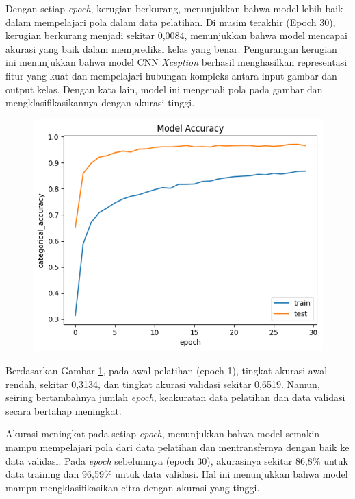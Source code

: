 Dengan setiap\textit{ epoch}, kerugian berkurang, menunjukkan bahwa model lebih baik dalam mempelajari pola dalam data pelatihan. Di musim terakhir (Epoch 30), kerugian berkurang menjadi sekitar 0,0084, menunjukkan bahwa model mencapai akurasi yang baik dalam memprediksi kelas yang benar. Pengurangan kerugian ini menunjukkan bahwa model CNN \textit{Xception} berhasil menghasilkan representasi fitur yang kuat dan mempelajari hubungan kompleks antara input gambar dan output kelas. Dengan kata lain, model ini mengenali pola pada gambar dan mengklasifikasikannya dengan akurasi tinggi.  
\begin{figure}[!hbt]
	\centering
	\includegraphics[width=0.7\linewidth]{gambar/bener/Accuracy_ModelResNet50V2.png}
	\label{fig:AkurasiCNNResNet50V2}
\end{figure}
Berdasarkan Gambar \ref{fig:AkurasiCNNResNet50V2}, pada awal pelatihan (epoch 1), tingkat akurasi awal rendah, sekitar 0,3134, dan tingkat akurasi validasi sekitar 0,6519. Namun, seiring bertambahnya jumlah\textit{ epoch}, keakuratan data pelatihan dan data validasi secara bertahap meningkat.

Akurasi meningkat pada setiap\textit{ epoch}, menunjukkan bahwa model semakin mampu mempelajari pola dari data pelatihan dan mentransfernya dengan baik ke data validasi. Pada\textit{ epoch} sebelumnya (epoch 30), akurasinya sekitar 86,8\% untuk data training dan 96,59\% untuk data validasi. Hal ini menunjukkan bahwa model mampu mengklasifikasikan citra dengan akurasi yang tinggi.  

